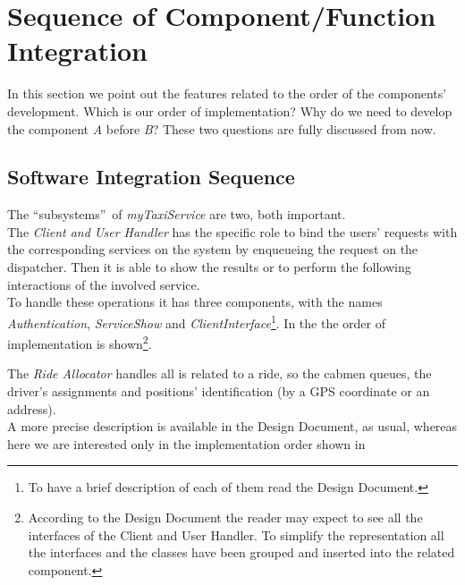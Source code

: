 \documentclass[\mainpath/main]{subfiles}
\begin{document}
\section{Sequence of Component/Function Integration}
\label{IntegrationStrategy:SequenceofComponent_FunctionIntegration}
In this section we point out the features related to the order of the components' development. Which is our order of implementation? Why do we need to develop the component \textit{A} before \textit{B}? These two questions are fully discussed from now.

\subsection{Software Integration Sequence}
\label{IntegrationStrategy:SequenceofComponent_FunctionIntegration:SoftwareIntegrationSequence}
The \textquotedblleft subsystems\textquotedblright\ of \textit{myTaxiService} are two, both important.\\
The \textit{Client and User Handler} has the specific role to bind the users' requests with the corresponding services on the system by enqueueing the request on the dispatcher. Then it is able to show the results or to perform the following interactions of the involved service.\\
To handle these operations it has three components, with the names \textit{Authentication}, \textit{ServiceShow} and \textit{ClientInterface}\footnote{To have a brief description of each of them read the Design Document.}. In the \textellipsis %
the order of implementation is shown\footnote{According to the Design Document the reader may expect to see all the interfaces of the Client and User Handler. To simplify the representation all the interfaces and the classes have been grouped and inserted into the related component.}.

\begin{center}
\end{center}

The \textit{Ride Allocator} handles all is related to a ride, so the cabmen queues, the driver's assignments and positions' identification (by a GPS coordinate or an address).\\
A more precise description is available in the Design Document, as usual, whereas here we are interested only in the implementation order shown in %
\end{document}
